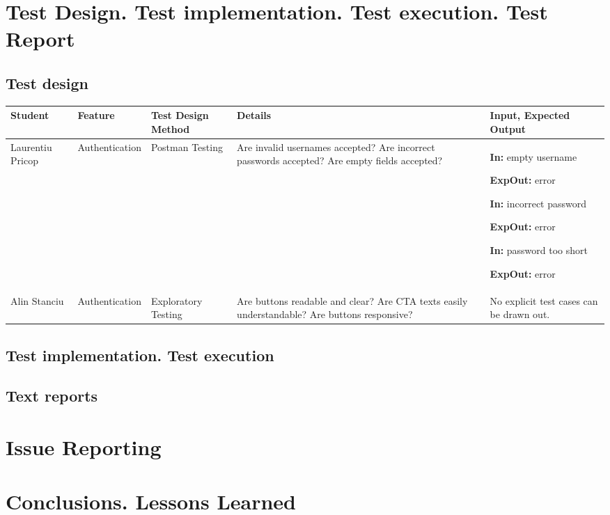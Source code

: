 \documentclass{article}
\begin{document}
\section{Test Design. Test implementation. Test execution. Test Report}

\subsection{Test design}

\begin{longtabu}{X[1] X[1]|X[1] X[2] X[2]}
    \hline
    Student & Feature & Test Design Method & Details & Input, Expected Output \\
    \hline
    \endhead
    Laurentiu Pricop & Authenti\-cation & Postman Testing & Are invalid usernames accepted? Are incorrect passwords accepted? Are empty fields accepted? &
    \par \textbf{In:} empty username
    \par \textbf{ExpOut:} error
    \par \textbf{In:} incorrect password
    \par \textbf{ExpOut:} error
    \par \textbf{In:} password too short
    \par \textbf{ExpOut:} error
    \\
    \hline
    Alin Stanciu & Authenti\-cation & Explora\-tory Testing & Are buttons readable and clear? Are CTA texts easily understandable? Are buttons responsive? &
    No explicit test cases can be drawn out.
    \\
    \hline
\end{longtabu}

\subsection{Test implementation. Test execution}
\subsection{Text reports}

\section{Issue Reporting}

\section{Conclusions. Lessons Learned}

\newpage

\end{document}
